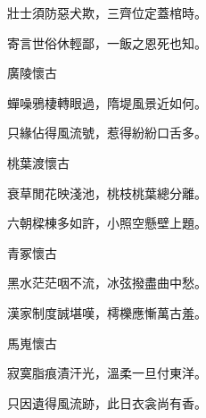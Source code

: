 \begin{poem}
    \begin{pl}壯士須防惡犬欺，三齊位定蓋棺時。\end{pl}

    \begin{pl}寄言世俗休輕鄙，一飯之恩死也知。\end{pl}

    \emptypl

    \begin{pl}廣陵懷古　\end{pl}

    \begin{pl}蟬噪鴉棲轉眼過，隋堤風景近如何。\end{pl}

    \begin{pl}只緣佔得風流號，惹得紛紛口舌多。\end{pl}

    \emptypl

    \begin{pl}桃葉渡懷古　\end{pl}

    \begin{pl}衰草閒花映淺池，桃枝桃葉總分離。\end{pl}

    \begin{pl}六朝樑棟多如許，小照空懸壁上題。\end{pl}

    \emptypl
    \begin{pl}青冢懷古　\end{pl}

    \begin{pl}黑水茫茫咽不流，冰弦撥盡曲中愁。\end{pl}

    \begin{pl}漢家制度誠堪嘆，樗櫟應慚萬古羞。\end{pl}

    \emptypl

    \begin{pl}馬嵬懷古　\end{pl}

    \begin{pl}寂寞脂痕漬汗光，溫柔一旦付東洋。\end{pl}

    \begin{pl}只因遺得風流跡，此日衣衾尚有香。\end{pl}


\end{poem}
